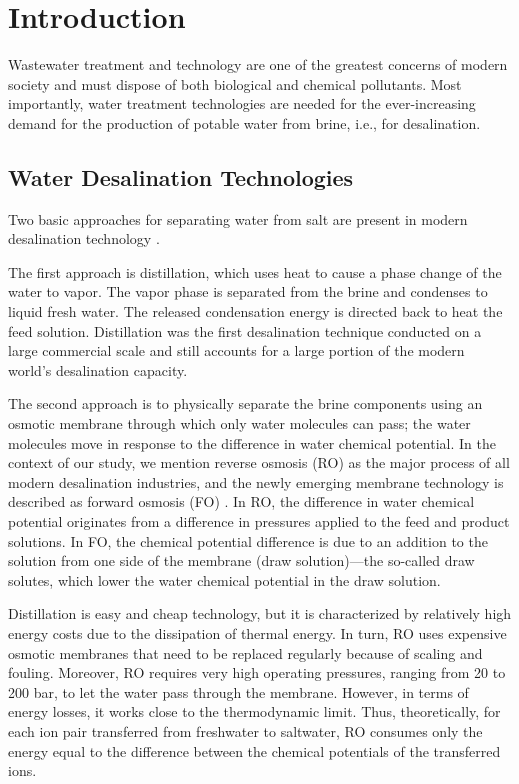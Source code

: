 \documentclass[gels,article,accept,pdftex,moreauthors]{Definitions/mdpi}
\newcommand{\ie}{{i.e.,} }
\begin{document}




\section{Introduction\label{sec: intro}}
Wastewater treatment and technology are one of the greatest concerns of modern society and must dispose of both biological \cite{guesmi2022} and chemical \cite{baaloudj2022_1,shahzad2022} pollutants.
Most importantly, water treatment technologies are needed for the ever-increasing demand for the production of potable water from brine, \ie for desalination.

\subsection{Water Desalination Technologies}
Two basic approaches for separating water from salt are present in modern desalination technology \cite{Miller2003,Curto2021}.

The first approach is distillation, which uses heat to cause a phase change of the water to vapor. 
The vapor phase is separated from the brine and condenses to liquid fresh water. 
The released condensation energy is directed back to heat the feed solution.
Distillation was the first desalination technique conducted on a large commercial scale and still accounts for a large portion of the modern world’s desalination capacity.

The second approach is to physically separate the brine components using an osmotic membrane through which only water molecules can pass; the water molecules move in response to the difference in water chemical potential.
In the context of our study, we mention reverse osmosis (RO) as the major process of all modern desalination industries, and the newly emerging membrane technology is described as forward osmosis (FO) \cite{Akther2015}. 
In RO, the difference in water chemical potential originates from a difference in pressures applied to the feed and product solutions. 
In FO, the chemical potential difference is due to an addition to the solution from one side of the membrane (draw solution)---the so-called draw solutes, which lower the water chemical potential in the draw solution.

Distillation is easy and cheap technology, but it is characterized by relatively high energy costs due to the dissipation of thermal energy. 
In turn, RO uses expensive osmotic membranes that need to be replaced regularly because of scaling and fouling. 
Moreover, RO requires very high operating pressures, ranging from 20 to 200 bar, to let the water pass through the membrane. 
However, in terms of energy losses, it works close to the thermodynamic limit.
Thus, theoretically, for each ion pair transferred from freshwater to saltwater, RO consumes only the energy equal to the difference between the chemical potentials of the transferred ions.
\end{document}
